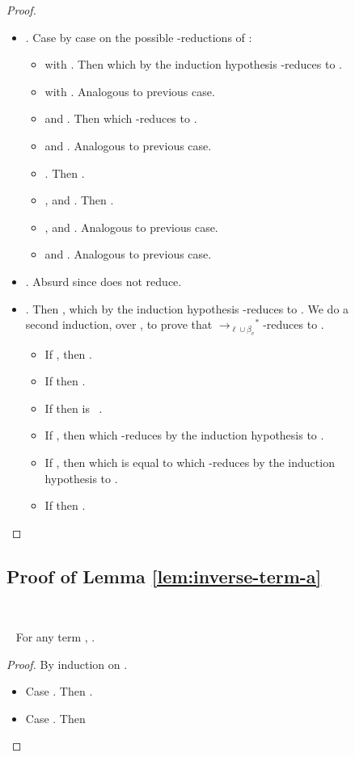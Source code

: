 \documentclass{LMCS}
\makeatletter
\newcommand{\recap}[2]{\medskip\noindent{\bf #1 \ref{#2}.}~}
\newcommand{\xto}[1]{\ensuremath{\rightarrow_{#1}}}
\newcommand{\toblinred}{\xto{\ell\cup\beta_v}}
\newcommand{\stoblinred}{\ensuremath{\xto{\ell\cup\beta_v}^{\ast}}}
\def\mynobreakpar{\par\nobreak\@afterheading}
\makeatother
\begin{document}
\begin{figure}
{\begin{proof}
\begin{description}
\begin{itemize}
\begin{itemize}
\begin{itemize}
		\item  and . Then  and this \toblinred-reduces to .
		\item  and . Then .
		\item  and . Then .
	      \end{itemize}
	    \item . Case by case on the possible -reductions of :
	      \begin{itemize}
		\item  with . Then  which by the induction hypothesis -reduces to .
		\item  with . Analogous to previous case.
		\item  and . Then  which -reduces to .
		\item  and . Analogous to previous case.
		\item . Then .
		\item ,  and . Then .
		\item ,  and . Analogous to previous case.
		\item  and . Analogous to previous case.
	      \end{itemize}
	    \item . Absurd since  does not reduce.
	    \item . Then , which by the induction hypothesis -reduces to .
	      We do a second induction, over , to prove that  \stoblinred-reduces to .
	      \begin{itemize} 
		\item If , then .
		\item If  then .
		\item If  then  is \
		  .
		\item If , then   which -reduces by the induction hypothesis to .
		\item If , then  which is equal to  which -reduces by the induction hypothesis to .
		\item If  then .\qedhere
	      \end{itemize}
	  \end{itemize}
      \end{itemize}
  \end{description} 
\end{proof}

\subsection{Proof of Lemma \ref{lem:inverse-term-a}}\label{proof:inverse-term-a}~
\mynobreakpar
\recap{Lemma}{lem:inverse-term-a} For any term , .\mynobreakpar
\begin{proof}
  By induction on .\mynobreakpar
  \begin{itemize}
    \item Case . Then .
    \item Case . Then 
      

\end{itemize}
\end{proof}}
\end{figure}
\end{document}
